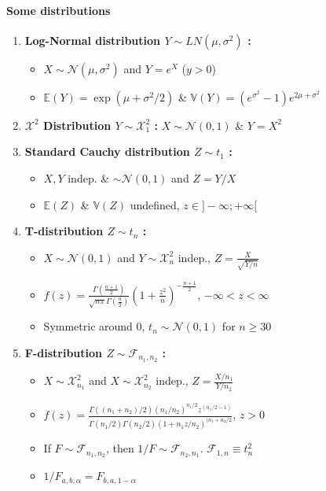 \documentclass[paper=a4,fontsize=8pt,pagesize,DIV=calc]{scrartcl}
\begin{document}
\begin{multicols}{3}
\paragraph{Some distributions}
\begin{enumerate}
\item \textbf{Log-Normal distribution $Y \sim LN(\mu,\sigma^2)$ :}
\begin{itemize}
\item $X \sim \mathcal{N}(\mu,\sigma^2)$ and $Y=e^X $ ($y>0$)
\item $\mathbb{E}(Y)=\exp(\mu+\sigma^2/2)$ \& $\mathbb{V}(Y)=(e^{\sigma^2}-1)e^{2\mu+\sigma^2}$
\end{itemize}
\item \textbf{$\mathcal{X}^2$ Distribution $Y \sim \mathcal{X}^2_1$ :} $X \sim \mathcal{N}(0,1)$ \& $Y=X^2$ 
\item \textbf{Standard Cauchy distribution $Z\sim t_1$ :}
\begin{itemize}
\item $X,Y$ indep. \& $\sim \mathcal{N}(0,1)$ and $Z=Y/X$ 
\item $\mathbb{E}(Z)$ \& $\mathbb{V}(Z)$ undefined, $z\in ]-\infty; +\infty[$
\end{itemize}
\item \textbf{T-distribution $Z \sim t_n$ :}
\begin{itemize}
\item $X \sim \mathcal{N}(0,1)$ and $Y \sim \mathcal{X}^2_n$ indep., $Z=\frac{X}{\sqrt{Y/n}}$
\item $f(z)=\frac{\Gamma \left( \frac{n+1}{2}\right)}{\sqrt{n\pi}\Gamma \left( \frac{n}{2}\right)} \left(1+\frac{z^2}{n} \right)^{-\frac{n+1}{2}}$, $-\infty<z<\infty$
\item Symmetric around 0, $t_n\sim \mathcal{N}(0,1)$ for $n\geq 30 $
\end{itemize}
\item \textbf{F-distribution $Z\sim \mathcal{F}_{n_1,n_2}$ :}
\begin{itemize}
\item $X \sim \mathcal{X}^2_{n_1}$ and $X \sim \mathcal{X}^2_{n_2}$ indep., $Z=\frac{X/n_1}{Y/n_2}$
\item $f(z)=\frac{\Gamma((n_1+n_2)/2)(n_1/n_2)^{n_1/2}z^{(n_1/2-1)}}{\Gamma(n_1/2)\Gamma(n_2/2)(1+n_1z/n_2)^{(n_1+n_2/2}}$, $z>0$
\item If $F \sim \mathcal{F}_{n_1,n_2}$, then $1/F\sim \mathcal{F}_{n_2,n_1}$. $\mathcal{F}_{1,n}\equiv t^2_n$
\item $1/F_{a,b,\alpha}=F_{b,a,1-\alpha}$
\end{itemize}
\end{enumerate}

\end{multicols}
\end{document}
